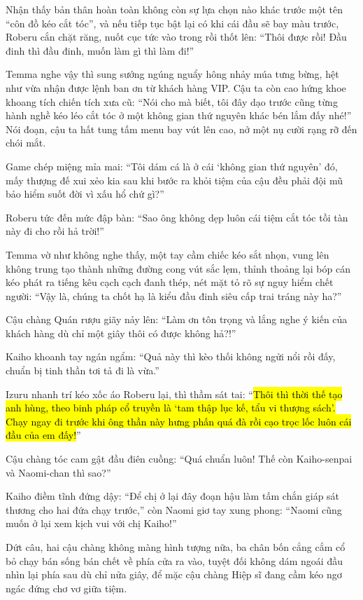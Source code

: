 \documentclass[../main.tex]{subfiles}
\begin{document}
Nhận thấy bản thân hoàn toàn không còn sự lựa chọn nào khác trước một tên ``côn đồ kéo cắt tóc'', và nếu tiếp tục bật lại có khi cái đầu sẽ bay màu trước, Roberu cắn chặt răng, nuốt cục tức vào trong rồi thốt lên: ``Thôi được rồi! Đầu đinh thì đầu đinh, muốn làm gì thì làm đi!''

Temma nghe vậy thì sung sướng ngúng nguẩy hông nhảy múa tưng bừng, hệt như vừa nhận được lệnh ban ơn từ khách hàng VIP. Cậu ta còn cao hứng khoe khoang tích chiến tích xưa cũ: ``Nói cho mà biết, tôi đây dạo trước cũng từng hành nghề kéo léo cắt tóc ở một không gian thứ nguyên khác bén lắm đấy nhé!'' Nói đoạn, cậu ta hất tung tấm menu bay vút lên cao, nở một nụ cười rạng rỡ đến chói mắt.

Game chép miệng mỉa mai: ``Tôi dám cá là ở cái `không gian thứ nguyên' đó, mấy thượng đế xui xẻo kia sau khi bước ra khỏi tiệm của cậu đều phải đội mũ bảo hiểm suốt đời vì xấu hổ chứ gì?''

Roberu tức đến mức đập bàn: ``Sao ông không dẹp luôn cái tiệm cắt tóc tồi tàn này đi cho rồi hả trời!''

Temma vờ như không nghe thấy, một tay cầm chiếc kéo sắt nhọn, vung lên không trung tạo thành những đường cong vút sắc lẹm, thỉnh thoảng lại bóp cán kéo phát ra tiếng kêu cạch cạch đanh thép, nét mặt tỏ rõ sự nguy hiểm chết người: ``Vậy là, chúng ta chốt hạ là kiểu đầu đinh siêu cấp trai tráng này ha?''

Cậu chàng Quán rượu giãy nảy lên: ``Làm ơn tôn trọng và lắng nghe ý kiến của khách hàng dù chỉ một giây thôi có được không hả?!''

Kaiho khoanh tay ngán ngẩm: ``Quả này thì kèo thối không ngửi nổi rồi đấy, chuẩn bị tinh thần tơi tả đi là vừa.''

Izuru nhanh trí kéo xốc áo Roberu lại, thì thầm sát tai: ``\hl{Thôi thì thời thế tạo anh hùng, theo binh pháp cổ truyền là `tam thập lục kế, tẩu vi thượng sách'. Chạy ngay đi trước khi ông thần này hưng phấn quá đà rồi cạo trọc lốc luôn cái đầu của em đấy!}''

Cậu chàng tóc cam gật đầu điên cuồng: ``Quá chuẩn luôn! Thế còn Kaiho-senpai và Naomi-chan thì sao?''

Kaiho điềm tĩnh đứng dậy: ``Để chị ở lại đây đoạn hậu làm tấm chắn giáp sát thương cho hai đứa chạy trước,'' còn Naomi giơ tay xung phong: ``Naomi cũng muốn ở lại xem kịch vui với chị Kaiho!''

Dứt câu, hai cậu chàng không màng hình tượng nữa, ba chân bốn cẳng cắm cổ bỏ chạy bán sống bán chết về phía cửa ra vào, tuyệt đối không dám ngoái đầu nhìn lại phía sau dù chỉ nửa giây, để mặc cậu chàng Hiệp sĩ đang cầm kéo ngơ ngác đứng chơ vơ giữa tiệm.
\end{document}
